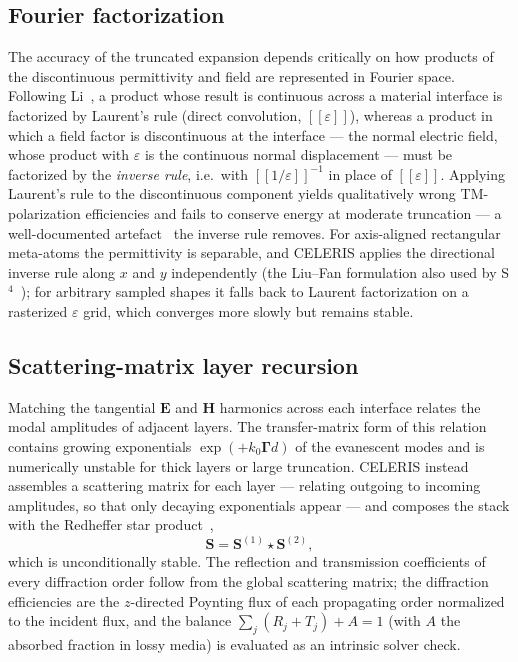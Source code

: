 \documentclass[preprint,12pt]{elsarticle}
\providecommand{\llbracket}{[\![}
\providecommand{\rrbracket}{]\!]}
\begin{document}
\subsection{Fourier factorization}
\label{sec:factorization}

The accuracy of the truncated expansion depends critically on how products of the
discontinuous permittivity and field are represented in Fourier space. Following
Li~\cite{li1996,li1997}, a product whose result is continuous across a material interface
is factorized by Laurent's rule (direct convolution,
$\llbracket\varepsilon\rrbracket$), whereas a product in which a field factor is
discontinuous at the interface --- the normal electric field, whose product with
$\varepsilon$ is the continuous normal displacement --- must be factorized by the
\emph{inverse rule}, i.e.\ with $\llbracket 1/\varepsilon\rrbracket^{-1}$ in place
of $\llbracket\varepsilon\rrbracket$. Applying Laurent's rule to the discontinuous
component yields qualitatively wrong TM-polarization efficiencies and fails to
conserve energy at moderate truncation --- a well-documented
artefact~\cite{lalanne1996,granet1996} the inverse rule removes. For axis-aligned rectangular meta-atoms the permittivity is
separable, and CELERIS applies the directional inverse rule along $x$ and $y$
independently (the Liu--Fan formulation also used by S$^4$~\cite{liu2012s4}); for
arbitrary sampled shapes it falls back to Laurent factorization on a rasterized
$\varepsilon$ grid, which converges more slowly but remains stable.

\subsection{Scattering-matrix layer recursion}
\label{sec:smatrix}

Matching the tangential $\mathbf{E}$ and $\mathbf{H}$ harmonics across each
interface relates the modal amplitudes of adjacent layers. The transfer-matrix
form of this relation contains growing exponentials
$\exp(+k_0\boldsymbol{\Gamma} d)$ of the evanescent modes and is numerically
unstable for thick layers or large truncation. CELERIS instead assembles a
scattering matrix for each layer --- relating outgoing to incoming amplitudes, so
that only decaying exponentials appear --- and composes the stack with the
Redheffer star product~\cite{redheffer1962,rumpf2011,moharam1995etm},
\begin{equation}
\mathbf{S} = \mathbf{S}^{(1)} \star \mathbf{S}^{(2)},
\end{equation}
which is unconditionally stable. The reflection and transmission coefficients of
every diffraction order follow from the global scattering matrix; the diffraction
efficiencies are the $z$-directed Poynting flux of each propagating order
normalized to the incident flux, and the balance $\sum_j (R_j + T_j) + A = 1$
(with $A$ the absorbed fraction in lossy media) is evaluated as an intrinsic
solver check.
\end{document}
